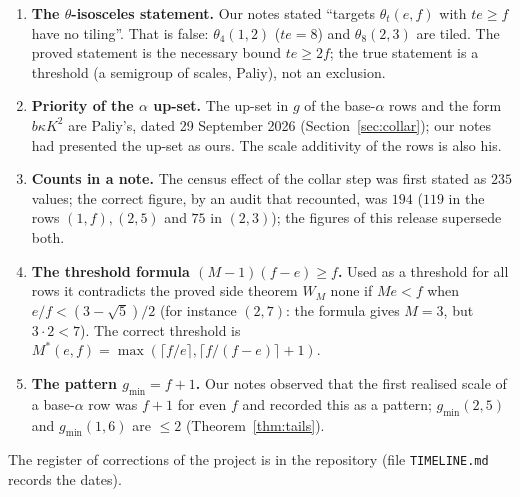 \documentclass[11pt,reqno]{amsart}
\theoremstyle{plain}
\theoremstyle{definition}
\begin{document}
\begin{enumerate}
\item \textbf{The $\theta$-isosceles statement.} Our notes stated ``targets $\theta_t(e,f)$ with $te\ge f$ have no tiling''. That is false: $\theta_4(1,2)$ ($te=8$) and $\theta_8(2,3)$ are tiled. The proved statement is the necessary bound $te\ge2f$; the true statement is a threshold (a semigroup of scales, Paliy), not an exclusion.
\item \textbf{Priority of the $\alpha$ up-set.} The up-set in $g$ of the base-$\alpha$ rows and the form $b\kappa K^2$ are Paliy's, dated 29 September 2026 (Section~\ref{sec:collar}); our notes had presented the up-set as ours. The scale additivity of the rows is also his.
\item \textbf{Counts in a note.} The census effect of the collar step was first stated as $235$ values; the correct figure, by an audit that recounted, was $194$ ($119$ in the rows $(1,f),(2,5)$ and $75$ in $(2,3)$); the figures of this release supersede both.
\item \textbf{The threshold formula $(M-1)(f-e)\ge f$.} Used as a threshold for all rows it contradicts the proved side theorem $W_M$ none if $Me<f$ when $e/f<(3-\sqrt5)/2$ (for instance $(2,7)$: the formula gives $M=3$, but $3\cdot2<7$). The correct threshold is $M^*(e,f)=\max(\lceil f/e\rceil,\lceil f/(f-e)\rceil+1)$.
\item \textbf{The pattern $g_{\min}=f+1$.} Our notes observed that the first realised scale of a base-$\alpha$ row was $f+1$ for even $f$ and recorded this as a pattern; $g_{\min}(2,5)$ and $g_{\min}(1,6)$ are $\le2$ (Theorem~\ref{thm:tails}).
\end{enumerate}
The register of corrections of the project is in the repository (file \texttt{TIMELINE.md} records the dates).

\end{document}
